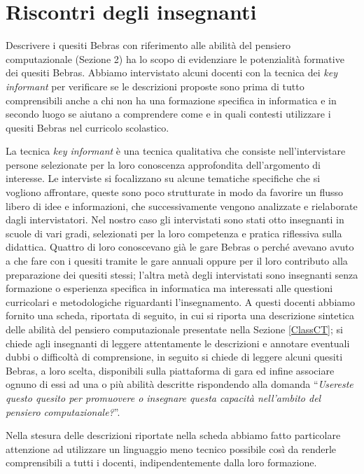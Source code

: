 \documentclass[12pt]{report}
\begin{document}
\begin{itemize}
\end{itemize}

\section{Riscontri degli insegnanti} \label{interviste}
Descrivere i quesiti Bebras con riferimento alle abilità del pensiero computazionale (Sezione 2) ha lo scopo di evidenziare le potenzialità formative dei quesiti Bebras.
Abbiamo intervistato alcuni docenti con la tecnica dei \textit{key informant} per verificare se le descrizioni proposte sono prima di tutto comprensibili anche a chi non ha una formazione specifica in informatica e in secondo luogo se aiutano a comprendere come e in quali contesti utilizzare i quesiti Bebras nel curricolo scolastico.


La tecnica \textit{key informant} è una tecnica qualitativa che consiste nell'intervistare persone selezionate per la loro conoscenza approfondita dell'argomento di interesse. Le interviste si focalizzano su alcune tematiche specifiche che si vogliono affrontare, queste sono poco strutturate in modo da favorire un flusso libero di idee e informazioni, che successivamente vengono analizzate e rielaborate dagli intervistatori.
Nel nostro caso gli intervistati sono stati otto insegnanti in scuole di vari gradi, selezionati per la loro competenza e pratica riflessiva sulla didattica. Quattro di loro conoscevano già le gare Bebras o perché avevano avuto a che fare con i quesiti tramite le gare annuali oppure per il loro contributo alla preparazione dei quesiti stessi; l'altra metà degli intervistati sono insegnanti senza formazione o esperienza specifica in informatica ma interessati alle questioni curricolari e metodologiche riguardanti l'insegnamento.
A questi docenti abbiamo fornito una scheda, riportata di seguito, in cui si riporta una descrizione sintetica delle abilità del pensiero computazionale presentate nella Sezione \ref{ClassCT}; si chiede agli insegnanti di leggere attentamente le descrizioni e annotare eventuali dubbi o difficoltà di comprensione, in seguito si chiede di leggere alcuni quesiti Bebras, a loro scelta, disponibili sulla piattaforma di gara ed infine associare ognuno di essi ad una o più abilità descritte rispondendo alla domanda ``\textit{Usereste questo quesito per promuovere o insegnare questa capacità nell'ambito del pensiero computazionale?}''.


Nella stesura delle descrizioni riportate nella scheda abbiamo fatto particolare attenzione ad utilizzare un linguaggio meno tecnico possibile così da renderle comprensibili a tutti i docenti, indipendentemente dalla loro formazione.
\end{document}
